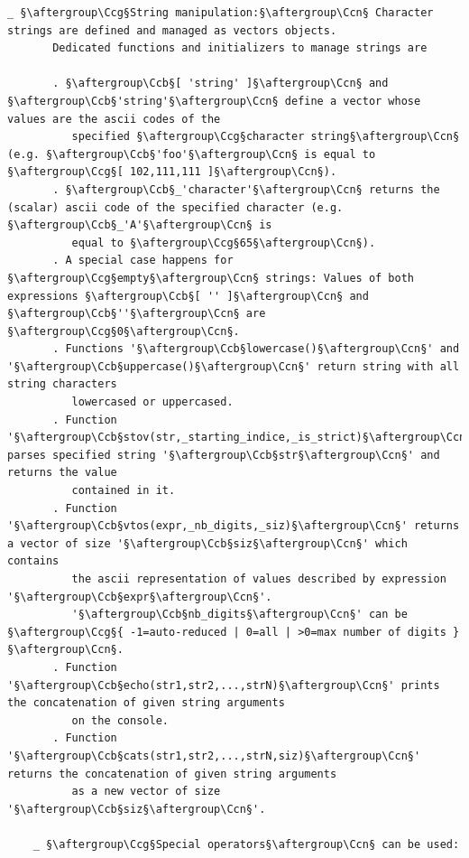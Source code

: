 \documentclass[a4paper,10.5pt,twoside]{book}
\def\Ccb{\color{cb}}
\def\Ccg{\color{cc}}
\def\Ccn{\color{black}}
\begin{document}
\begin{lstlisting}[escapechar=§]
    _ §\aftergroup\Ccg§String manipulation:§\aftergroup\Ccn§ Character strings are defined and managed as vectors objects. 
       Dedicated functions and initializers to manage strings are 
 
       . §\aftergroup\Ccb§[ 'string' ]§\aftergroup\Ccn§ and §\aftergroup\Ccb§'string'§\aftergroup\Ccn§ define a vector whose values are the ascii codes of the 
          specified §\aftergroup\Ccg§character string§\aftergroup\Ccn§ (e.g. §\aftergroup\Ccb§'foo'§\aftergroup\Ccn§ is equal to §\aftergroup\Ccg§[ 102,111,111 ]§\aftergroup\Ccn§). 
       . §\aftergroup\Ccb§_'character'§\aftergroup\Ccn§ returns the (scalar) ascii code of the specified character (e.g. §\aftergroup\Ccb§_'A'§\aftergroup\Ccn§ is 
          equal to §\aftergroup\Ccg§65§\aftergroup\Ccn§). 
       . A special case happens for §\aftergroup\Ccg§empty§\aftergroup\Ccn§ strings: Values of both expressions §\aftergroup\Ccb§[ '' ]§\aftergroup\Ccn§ and §\aftergroup\Ccb§''§\aftergroup\Ccn§ are §\aftergroup\Ccg§0§\aftergroup\Ccn§. 
       . Functions '§\aftergroup\Ccb§lowercase()§\aftergroup\Ccn§' and '§\aftergroup\Ccb§uppercase()§\aftergroup\Ccn§' return string with all string characters 
          lowercased or uppercased. 
       . Function '§\aftergroup\Ccb§stov(str,_starting_indice,_is_strict)§\aftergroup\Ccn§' parses specified string '§\aftergroup\Ccb§str§\aftergroup\Ccn§' and returns the value 
          contained in it. 
       . Function '§\aftergroup\Ccb§vtos(expr,_nb_digits,_siz)§\aftergroup\Ccn§' returns a vector of size '§\aftergroup\Ccb§siz§\aftergroup\Ccn§' which contains 
          the ascii representation of values described by expression '§\aftergroup\Ccb§expr§\aftergroup\Ccn§'. 
          '§\aftergroup\Ccb§nb_digits§\aftergroup\Ccn§' can be §\aftergroup\Ccg§{ -1=auto-reduced | 0=all | >0=max number of digits }§\aftergroup\Ccn§. 
       . Function '§\aftergroup\Ccb§echo(str1,str2,...,strN)§\aftergroup\Ccn§' prints the concatenation of given string arguments 
          on the console. 
       . Function '§\aftergroup\Ccb§cats(str1,str2,...,strN,siz)§\aftergroup\Ccn§' returns the concatenation of given string arguments 
          as a new vector of size '§\aftergroup\Ccb§siz§\aftergroup\Ccn§'. 
 
    _ §\aftergroup\Ccg§Special operators§\aftergroup\Ccn§ can be used: 
 

\end{lstlisting}
\end{document}
